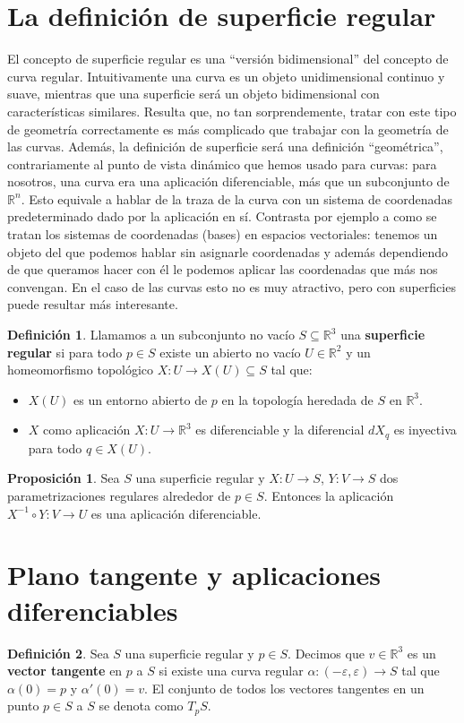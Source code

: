 \documentclass{article}
\theoremstyle{definition}
\newtheorem{prop}{Proposición}
\newtheorem{define}{Definición}
\newcommand{\reales}{\mathbb{R}}
\begin{document}
\section{La definición de superficie regular}
El concepto de superficie regular es una ``versión bidimensional'' del concepto de curva regular. Intuitivamente una curva es un objeto unidimensional continuo y suave, mientras que una superficie será un objeto bidimensional con características similares. Resulta que, no tan sorprendemente, tratar con este tipo de geometría correctamente es más complicado que trabajar con la geometría de las curvas. Además, la definición de superficie será una definición ``geométrica'', contrariamente al punto de vista dinámico que hemos usado para curvas: para nosotros, una curva era una aplicación diferenciable, más que un subconjunto de $\reales^n$. Esto equivale a hablar de la traza de la curva con un sistema de coordenadas predeterminado dado por la aplicación en sí. Contrasta por ejemplo a como se tratan los sistemas de coordenadas (bases) en espacios vectoriales: tenemos un objeto del que podemos hablar sin asignarle coordenadas y además dependiendo de que queramos hacer con él le podemos aplicar las coordenadas que más nos convengan. En el caso de las curvas esto no es muy atractivo, pero con superficies puede resultar más interesante.

\begin{define}
	Llamamos a un subconjunto no vacío $S \subseteq \reales^3$ una \textbf{superficie regular} si para todo $p \in S$ existe un abierto no vacío $U \in \reales^2$ y un homeomorfismo topológico $X: U \rightarrow X(U) \subseteq S$ tal que:
	\begin{itemize}
		\item
		$X(U)$ es un entorno abierto de $p$ en la topología heredada de $S$ en $\reales^3$.
		\item
		$X$ como aplicación $X: U \rightarrow \reales^{3}$ es diferenciable y la diferencial $dX_q$ es inyectiva para todo $q \in X(U)$.
	\end{itemize}
\end{define}

\begin{prop}
	Sea $S$ una superficie regular y $X: U \rightarrow S$, $Y: V \rightarrow S$ dos parametrizaciones regulares alrededor de $p \in S$. Entonces la aplicación $X^{-1} \circ Y : V \rightarrow U$ es una aplicación diferenciable.
\end{prop}

\section{Plano tangente y aplicaciones diferenciables}
\begin{define}
	Sea $S$ una superficie regular y $p \in S$. Decimos que $v \in \reales^3$ es un \textbf{vector tangente} en $p$ a $S$ si existe una curva regular $\alpha: (-\varepsilon, \varepsilon) \rightarrow S$ tal que $\alpha(0) = p$ y $\alpha' (0) = v$. El conjunto de todos los vectores tangentes en un punto $p \in S$ a $S$ se denota como $T_p S$.
\end{define}
\end{document}
